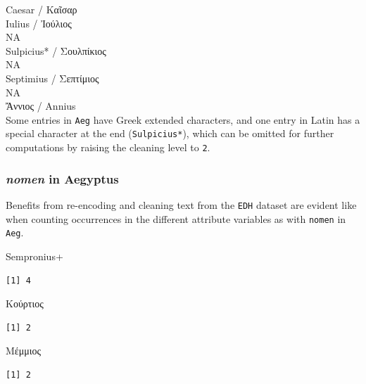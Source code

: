 \documentclass[a4paper,11pt]{memoir}
\newenvironment{Shaded}{\begin{snugshade}}{\end{snugshade}}
\newcommand{\CommentTok}[1]{\textcolor[rgb]{0.56,0.35,0.01}{\textit{#1}}}
\newcommand{\DataTypeTok}[1]{\textcolor[rgb]{0.13,0.29,0.53}{#1}}
\newcommand{\ErrorTok}[1]{\textcolor[rgb]{0.64,0.00,0.00}{\textbf{#1}}}
\newcommand{\KeywordTok}[1]{\textcolor[rgb]{0.13,0.29,0.53}{\textbf{#1}}}
\newcommand{\NormalTok}[1]{#1}
\newcommand{\OperatorTok}[1]{\textcolor[rgb]{0.81,0.36,0.00}{\textbf{#1}}}
\newcommand{\OtherTok}[1]{\textcolor[rgb]{0.56,0.35,0.01}{#1}}
\newcommand{\StringTok}[1]{\textcolor[rgb]{0.31,0.60,0.02}{#1}}
\begin{document}
\noindent
Caesar / Καῖσαρ \\
Iulius / Ἰούλιος \\
NA \\
Sulpicius* / Σουλπίκιος \\
NA \\
Septimius / Σεπτίμιος \\
NA \\
Ἄννιος / Annius\\

Some entries in \texttt{Aeg} have Greek extended characters, and one
entry in Latin has a special character at the end (\texttt{Sulpicius*}),
which can be omitted for further computations by raising the cleaning
level to \texttt{2}.

\hypertarget{nomen-in-aegyptus}{%
\subsubsection{\texorpdfstring{\emph{nomen} in
Aegyptus}{nomen in Aegyptus}}\label{nomen-in-aegyptus}}

Benefits from re-encoding and cleaning text from the \texttt{EDH}
dataset are evident like when counting occurrences in the different
attribute variables as with \texttt{nomen} in \texttt{Aeg}.

\begin{Shaded}
\end{Shaded}

Sempronius+

\begin{verbatim}
[1] 4
\end{verbatim}

Κούρτιος

\begin{verbatim}
[1] 2
\end{verbatim}

Μέμμιος

\begin{verbatim}
[1] 2
\end{verbatim}
\end{document}
